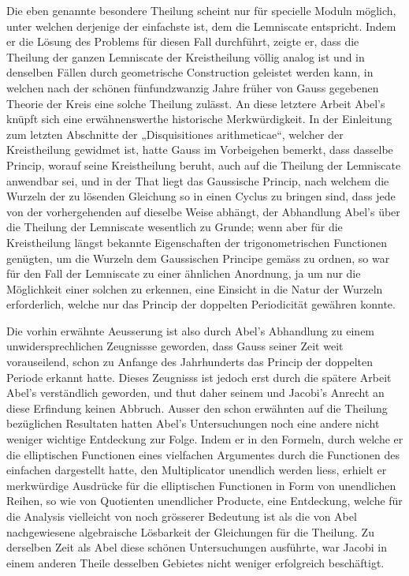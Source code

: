 \documentclass[11pt]{article}
\begin{document}
Die eben genannte besondere Theilung scheint nur für specielle Moduln möglich, unter welchen derjenige der einfachste ist, dem die Lemniscate entspricht. Indem er die Lösung des Problems für diesen Fall durchführt, zeigte er, dass die Theilung der ganzen Lemniscate der Kreistheilung völlig analog ist und in denselben Fällen durch geometrische Construction geleistet werden kann, in welchen nach der schönen fünfundzwanzig Jahre früher von Gauss gegebenen Theorie der Kreis eine solche Theilung zulässt. An diese letztere Arbeit Abel’s knüpft sich eine erwähnenswerthe historische Merkwürdigkeit. In der Einleitung zum letzten Abschnitte der „Disquisitiones arithmeticae“, welcher der Kreistheilung gewidmet ist, hatte Gauss im Vorbeigehen bemerkt, dass dasselbe Princip, worauf seine Kreistheilung beruht, auch auf die Theilung der Lemniscate anwendbar sei, und in der That liegt das Gaussische Princip, nach welchem die Wurzeln der zu lösenden Gleichung so in einen Cyclus zu bringen sind, dass jede von der vorhergehenden auf dieselbe Weise abhängt, der Abhandlung Abel’s über die Theilung der Lemniscate wesentlich zu Grunde; wenn aber für die Kreistheilung längst bekannte Eigenschaften der trigonometrischen Functionen genügten, um die Wurzeln dem Gaussischen Principe gemäss zu ordnen, so war für den Fall der Lemniscate zu einer ähnlichen Anordnung, ja um nur die Möglichkeit einer solchen zu erkennen, eine Einsicht in die Natur der Wurzeln erforderlich, welche nur das Princip der doppelten Periodicität gewähren konnte.

Die vorhin erwähnte Aeusserung ist also durch Abel’s Abhandlung zu einem unwidersprechlichen Zeugnissse geworden, dass Gauss seiner Zeit weit vorauseilend, schon zu Anfange des Jahrhunderts das Princip der doppelten Periode erkannt hatte. Dieses Zeugnisss ist jedoch erst durch die spätere Arbeit Abel’s verständlich geworden, und thut daher seinem und Jacobi’s Anrecht an diese Erfindung keinen Abbruch. Ausser den schon erwähnten auf die Theilung bezüglichen Resultaten hatten Abel’s Untersuchungen noch eine andere nicht weniger wichtige Entdeckung zur Folge. Indem er in den Formeln, durch welche er die elliptischen Functionen eines vielfachen Argumentes durch die Functionen des einfachen dargestellt hatte, den Multiplicator unendlich werden liess, erhielt er merkwürdige Ausdrücke für die elliptischen Functionen in Form von unendlichen Reihen, so wie von Quotienten unendlicher Producte, eine Entdeckung, welche für die Analysis vielleicht von noch grösserer Bedeutung ist als die von Abel nachgewiesene algebraische Lösbarkeit der Gleichungen für die Theilung. Zu derselben Zeit als Abel diese schönen Untersuchungen ausführte, war Jacobi in einem anderen Theile desselben Gebietes nicht weniger erfolgreich beschäftigt.
\end{document}
